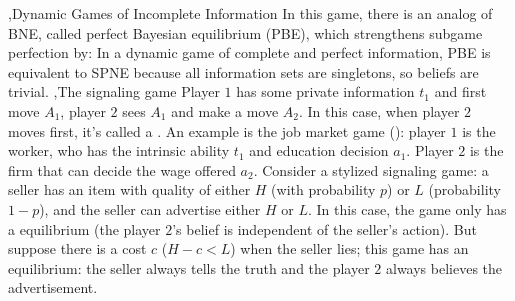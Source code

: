 \documentclass[10pt]{report}
\begin{document}
\sep{Dynamic Games of Incomplete Information}
In this game, there is an analog of BNE, called perfect Bayesian equilibrium (PBE), which strengthens subgame perfection by:
In a dynamic game of complete and perfect information, PBE is equivalent to SPNE because all information sets are singletons, so beliefs are trivial. 
\sep{The signaling game}
Player $1$ has some private information $t_1$ and first move $A_1$, player $2$ sees $A_1$ and make a move $A_2$. In this case, when player $2$ moves first, it's called a . 
An example is the job market game (\cite{Spence1973}): player $1$ is the worker, who has the intrinsic ability $t_1$ and education decision $a_1$. Player $2$ is the firm that can decide the wage offered $a_2$.
Consider a stylized signaling game: a seller has an item with quality of either $H$ (with probability $p$) or $L$ (probability $1-p$), and the seller can advertise either $H$ or $L$. In this case, the game only has a 
 equilibrium (the player $2$'s belief is independent of the seller's action). But suppose there is a cost $c$ ($H-c<L$) when the seller lies; this game has an  equilibrium: the seller 
always tells the truth and the player $2$ always believes the advertisement.
\end{document}
